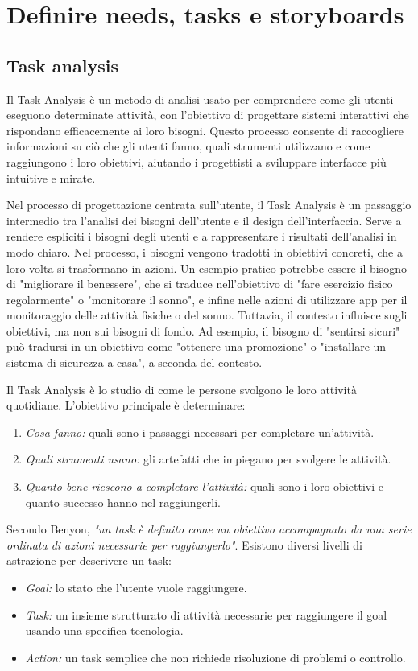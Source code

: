 \chapter{Definire needs, tasks e storyboards}
\section{Task analysis}
Il Task Analysis è un metodo di analisi usato per comprendere come gli utenti eseguono determinate attività, con l’obiettivo di progettare sistemi interattivi che rispondano efficacemente ai loro bisogni. Questo processo consente di raccogliere informazioni su ciò che gli utenti fanno, quali strumenti utilizzano e come raggiungono i loro obiettivi, aiutando i progettisti a sviluppare interfacce più intuitive e mirate.

Nel processo di progettazione centrata sull'utente, il Task Analysis è un passaggio intermedio tra l’analisi dei bisogni dell’utente e il design dell’interfaccia. Serve a rendere espliciti i bisogni degli utenti e a rappresentare i risultati dell’analisi in modo chiaro. Nel processo, i bisogni vengono tradotti in obiettivi concreti, che a loro volta si trasformano in azioni. Un esempio pratico potrebbe essere il bisogno di "migliorare il benessere", che si traduce nell'obiettivo di "fare esercizio fisico regolarmente" o "monitorare il sonno", e infine nelle azioni di utilizzare app per il monitoraggio delle attività fisiche o del sonno. Tuttavia, il contesto influisce sugli obiettivi, ma non sui bisogni di fondo. Ad esempio, il bisogno di "sentirsi sicuri" può tradursi in un obiettivo come "ottenere una promozione" o "installare un sistema di sicurezza a casa", a seconda del contesto.

Il Task Analysis è lo studio di come le persone svolgono le loro attività quotidiane. L’obiettivo principale è determinare:
\begin{enumerate}
    \item \textit{Cosa fanno:} quali sono i passaggi necessari per completare un'attività.
    \item \textit{Quali strumenti usano:} gli artefatti che impiegano per svolgere le attività.
    \item \textit{Quanto bene riescono a completare l'attività:} quali sono i loro obiettivi e quanto successo hanno nel raggiungerli.
\end{enumerate}
Secondo Benyon, \textit{"un task è definito come un obiettivo accompagnato da una serie ordinata di azioni necessarie per raggiungerlo"}. Esistono diversi livelli di astrazione per descrivere un task:
\begin{itemize}
    \item \textit{Goal:} lo stato che l'utente vuole raggiungere.
    \item \textit{Task:} un insieme strutturato di attività necessarie per raggiungere il goal usando una specifica tecnologia.
    \item \textit{Action:} un task semplice che non richiede risoluzione di problemi o controllo.
\end{itemize}


